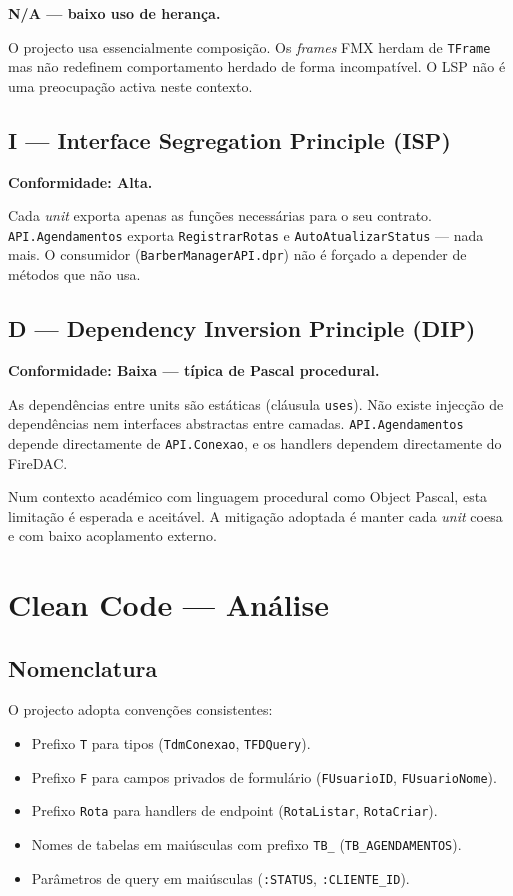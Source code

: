 \documentclass[12pt,a4paper]{article}
\begin{document}
\textbf{N/A — baixo uso de herança.}

O projecto usa essencialmente composição. Os \textit{frames} FMX herdam de \texttt{TFrame} mas não redefinem comportamento herdado de forma incompatível. O LSP não é uma preocupação activa neste contexto.

\subsection{I — Interface Segregation Principle (ISP)}

\textbf{Conformidade: Alta.}

Cada \textit{unit} exporta apenas as funções necessárias para o seu contrato. \texttt{API.Agendamentos} exporta \texttt{RegistrarRotas} e \texttt{AutoAtualizarStatus} — nada mais. O consumidor (\texttt{BarberManagerAPI.dpr}) não é forçado a depender de métodos que não usa.

\subsection{D — Dependency Inversion Principle (DIP)}

\textbf{Conformidade: Baixa — típica de Pascal procedural.}

As dependências entre units são estáticas (cláusula \texttt{uses}). Não existe injecção de dependências nem interfaces abstractas entre camadas. \texttt{API.Agendamentos} depende directamente de \texttt{API.Conexao}, e os handlers dependem directamente do FireDAC.

Num contexto académico com linguagem procedural como Object Pascal, esta limitação é esperada e aceitável. A mitigação adoptada é manter cada \textit{unit} coesa e com baixo acoplamento externo.

\newpage
\section{Clean Code — Análise}

\subsection{Nomenclatura}

O projecto adopta convenções consistentes:

\begin{itemize}
  \item Prefixo \texttt{T} para tipos (\texttt{TdmConexao}, \texttt{TFDQuery}).
  \item Prefixo \texttt{F} para campos privados de formulário (\texttt{FUsuarioID}, \texttt{FUsuarioNome}).
  \item Prefixo \texttt{Rota} para handlers de endpoint (\texttt{RotaListar}, \texttt{RotaCriar}).
  \item Nomes de tabelas em maiúsculas com prefixo \texttt{TB\_} (\texttt{TB\_AGENDAMENTOS}).
  \item Parâmetros de query em maiúsculas (\texttt{:STATUS}, \texttt{:CLIENTE\_ID}).
\end{itemize}
\end{document}
